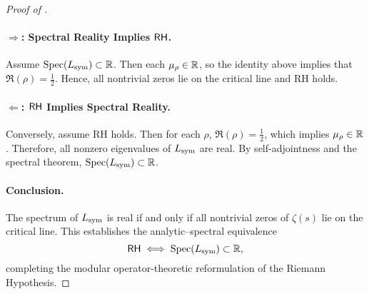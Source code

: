 \begin{proof}[Proof of ]
\paragraph*{\( \Rightarrow \): Spectral Reality Implies \(\mathsf{RH}\).}
Assume \( \operatorname{Spec}(L_{\mathrm{sym}}) \subset \mathbb{R} \). Then each \( \mu_\rho \in \mathbb{R} \), so the identity above implies that \( \Re(\rho) = \tfrac{1}{2} \). Hence, all nontrivial zeros lie on the critical line and RH holds.

\paragraph*{\( \Leftarrow \): \(\mathsf{RH}\) Implies Spectral Reality.}
Conversely, assume RH holds. Then for each \( \rho \), \( \Re(\rho) = \tfrac{1}{2} \), which implies \( \mu_\rho \in \mathbb{R} \). Therefore, all nonzero eigenvalues of \( L_{\mathrm{sym}} \) are real. By self-adjointness and the spectral theorem, \( \operatorname{Spec}(L_{\mathrm{sym}}) \subset \mathbb{R} \).

\paragraph*{Conclusion.}
The spectrum of \( L_{\mathrm{sym}} \) is real if and only if all nontrivial zeros of \( \zeta(s) \) lie on the critical line. This establishes the analytic–spectral equivalence
\[
\mathsf{RH} \iff \operatorname{Spec}(L_{\mathrm{sym}}) \subset \mathbb{R},
\]
completing the modular operator-theoretic reformulation of the Riemann Hypothesis.
\end{proof}
